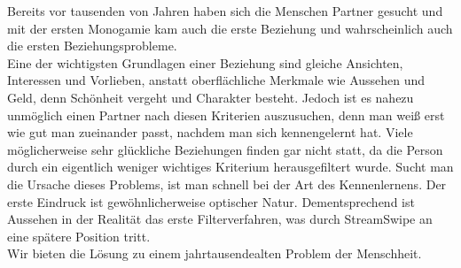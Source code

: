 
Bereits vor tausenden von Jahren haben sich die Menschen Partner gesucht und mit der ersten Monogamie kam auch die erste Beziehung und wahrscheinlich auch die ersten Beziehungsprobleme.\\
Eine der wichtigsten Grundlagen einer Beziehung sind gleiche Ansichten, Interessen und Vorlieben, anstatt oberflächliche Merkmale wie Aussehen und Geld, denn Schönheit vergeht und Charakter besteht. Jedoch ist es nahezu unmöglich einen Partner nach diesen Kriterien  auszusuchen, denn man weiß erst wie gut man zueinander passt, nachdem man sich kennengelernt hat. Viele möglicherweise sehr glückliche Beziehungen finden gar nicht statt, da die Person durch ein eigentlich weniger wichtiges Kriterium herausgefiltert wurde. Sucht man die Ursache dieses Problems, ist man schnell bei der Art des Kennenlernens. Der erste Eindruck ist gewöhnlicherweise optischer Natur. Dementsprechend ist Aussehen in der Realität das erste Filterverfahren, was durch StreamSwipe an eine spätere  Position tritt.\\
Wir bieten die Lösung zu einem jahrtausendealten Problem der Menschheit.

